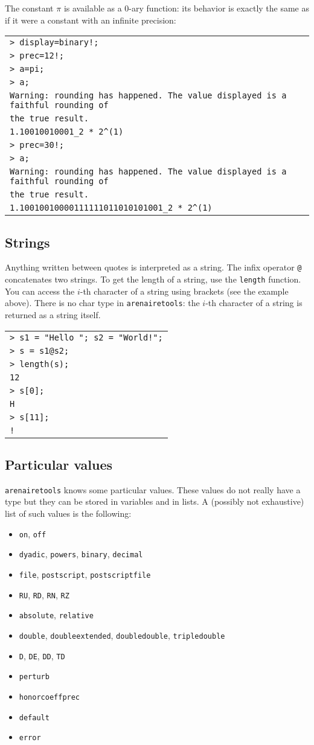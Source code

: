 \documentclass[a4paper]{article}
\newcommand{\com}[1]{\texttt{#1}}
\newcommand{\arenairetools}{\texttt{arenairetools}\xspace}
\newcommand{\code}[1]{\begin{center}
\begin{tabular}{|p{14.8cm}|}
\hline
#1
\hline
\end{tabular}
\end{center}
}
\newcommand{\ligne}[1]{\texttt{#1}\\}
\begin{document}
The constant $\pi$ is available as a $0$-ary function: its behavior is exactly the same as if it were a constant with an infinite precision:

\code{
\ligne{> display=binary!;}
\ligne{> prec=12!;}
\ligne{> a=pi;}
\ligne{> a;}
\ligne{Warning: rounding has happened. The value displayed is a faithful rounding of}
\ligne{the true result.}
\ligne{1.10010010001\_2 * 2\^{}(1)}
\ligne{> prec=30!;}
\ligne{> a;}
\ligne{Warning: rounding has happened. The value displayed is a faithful rounding of}
\ligne{the true result.}
\ligne{1.10010010000111111011010101001\_2 * 2\^{}(1)}
}


\subsection{Strings}
Anything written between quotes is interpreted as a string. The infix operator \com{@} concatenates two strings. To get the length of a string, use the \com{length} function. You can access the $i$-th character of a string using brackets (see the example above). There is no char type in \arenairetools: the $i$-th character of a string is returned as a string itself.

\code{
\ligne{> s1 = "Hello "; s2 = "World!";}
\ligne{> s = s1@s2;}
\ligne{> length(s);}
\ligne{12}
\ligne{> s[0];}
\ligne{H}
\ligne{> s[11];}
\ligne{!}
}

\subsection{Particular values}
\arenairetools knows some particular values. These values do not really have a type but they can be stored in variables and in lists. A (possibly not exhaustive) list of such values is the following:

\begin{itemize}
\item \com{on}, \com{off}
\item \com{dyadic}, \com{powers}, \com{binary}, \com{decimal}
\item \com{file}, \com{postscript}, \com{postscriptfile}
\item \com{RU}, \com{RD}, \com{RN}, \com{RZ}
\item \com{absolute}, \com{relative}
\item \com{double}, \com{doubleextended}, \com{doubledouble}, \com{tripledouble}
\item \com{D}, \com{DE}, \com{DD}, \com{TD}
\item \com{perturb}
\item \com{honorcoeffprec}
\item \com{default}
\item \com{error}
\end{itemize}
\end{document}
